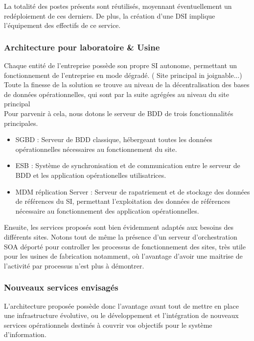 La totalité des postes présents sont réutilisés, moyennant éventuellement un redéploiement de ces derniers. De plus, la création d'une DSI implique l'équipement des effectifs de ce service.

\subsubsection{Architecture pour laboratoire \& Usine}

Chaque entité de l'entreprise possède son propre SI autonome, permettant un fonctionnement de l'entreprise en mode dégradé. ( Site principal in joignable...)
Toute la finesse de la solution se trouve au niveau de la décentralisation des bases de données opérationnelles, qui sont par la suite agrégées au niveau du site principal \\
Pour parvenir  à cela, nous dotons le serveur de BDD de trois fonctionnalités principales.
\begin{itemize}
\item SGBD : Serveur de BDD classique, hébergeant toutes les données opérationnelles nécessaires au fonctionnement du site.
\item ESB : Système de synchronisation et de communication entre le serveur de BDD et les application opérationelles utilisatrices.
\item MDM réplication Server :  Serveur de rapatriement et de stockage des données de références du SI, permettant l'exploitation des données de références nécessaire au fonctionnement des application opérationnelles.
\end{itemize}

Ensuite, les services proposés sont bien évidemment adaptés aux besoins des différents sites. Notons tout de même la présence d'un serveur d'orchestration SOA déporté pour controller les processus de fonctionnement des sites, très utile pour les usines de fabrication notamment, où l'avantage d'avoir une maitrise de l'activité par processus n'est plus à démontrer.

\subsubsection{Nouveaux services envisagés}

L'architecture proposée possède donc l'avantage avant tout de mettre en place une infrastructure évolutive, ou le développement et l'intégration de nouveaux services opérationnels destinés à  couvrir vos objectifs pour le système d'information.

